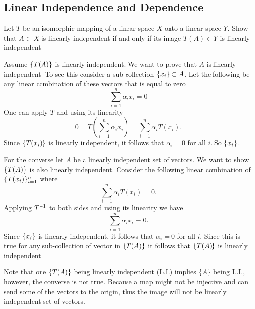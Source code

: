 \subsection{Linear Independence and Dependence}
\begin{problem}
	Let $ T $ be an isomorphic mapping of a linear space $ X $ onto a linear space $ Y $. Show that $ A\subset X $ is linearly independent if and only if its image $ T(A)\subset Y $ is linearly independent.
\end{problem}
\begin{solution}
	Assume $ \{T(A)\} $ is linearly independent. We want to prove that $ A $ is linearly independent. To see this consider a sub-collection $ \{x_i\} \subset A $. Let the following be any linear combination of these vectors that is equal to zero
	\[ \sum_{i=1}^{n}\alpha_i x_i = 0 \]
	One can apply $ T $ and using its linearity
	\[ 0 = T(\sum_{i=1}^{n}\alpha_i x_i) = \sum_{i=1}^{n}\alpha_i T(x_i).  \]
	Since $ \{T(x_i)\} $ is linearly independent, it follows that $ \alpha_i = 0 $ for all $ i $. So $ \{x_i\} $.
	
	For the converse let $ A $ be a linearly independent set of vectors. We want to show $ \{T(A)\} $ is also linearly independent. Consider the following linear combination of $ \{T(x_i)\}_{i=1}^n $ where
	\[ \sum_{i=1}^{n}\alpha_i T(x_i) =0. \]
	Applying $ T^{-1} $ to both sides and using its linearity we have
	\[ \sum_{i=1}^n \alpha_i x_i = 0. \]
	Since $ \{x_i\} $ is linearly independent, it follows that $ \alpha_i = 0 $ for all $ i $. Since this is true for any sub-collection of vector in $ \{T(A)\} $ it follows that $ \{T(A)\} $ is linearly independent.
\end{solution}

\begin{remark}
	Note that one $ \{T(A)\} $ being linearly independent (L.I.) implies $ \{A\} $ being L.I., however, the converse is not true. Because a map might not be injective and can send some of the vectors to the origin, thus the image will not be linearly independent set of vectors. 
\end{remark}

